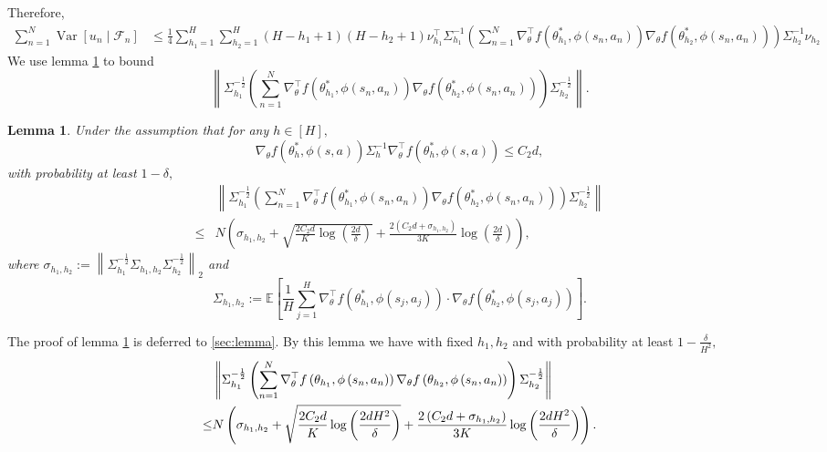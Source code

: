 \documentclass{article}
\numberwithin{equation}{section}
\theoremstyle{plain}
\newtheorem{lemma}[theorem]{Lemma}
\theoremstyle{definition}
\theoremstyle{remark}
\begin{document}
Therefore,
\begin{align}
    \sum_{n=1}^N \operatorname{Var}\left[u_n\mid \mathcal{F}_n\right]
    &\leq \frac{1}{4} \sum_{h_1=1}^H \sum_{h_2=1}^H (H-h_1+1)(H-h_2+1)\nu_{h_1}^{\top} \Sigma_{h_1}^{-1} \left(\sum_{n=1}^N \nabla_{\theta}^{\top}f\left(\theta_{h_1}^*, \phi\left(s_n, a_n\right)\right) \nabla_{\theta} f\left(\theta_{h_2}^*, \phi\left(s_n, a_n\right)\right) \right) \Sigma_{h_2}^{-1} \nu_{h_2} \label{positivity_variance}
\end{align}
We use lemma \ref{lemma_first_order} to bound
\begin{equation*}
    \left\|\Sigma_{h_1}^{-\frac{1}{2}} \left(\sum_{n=1}^N \nabla_{\theta}^{\top}f\left(\theta_{h_1}^*, \phi\left(s_n, a_n\right)\right) \nabla_{\theta} f\left(\theta_{h_2}^*, \phi\left(s_n, a_n\right)\right) \right) \Sigma_{h_2}^{-\frac{1}{2}}\right\|.
\end{equation*} 
\begin{lemma}\label{lemma_first_order}
   Under the assumption that for any $h \in [H],$
   $$
   \nabla_{\theta} f(\theta^*_h, \phi(s, a)) \Sigma_{h}^{-1} \nabla_{\theta}^{\top} f(\theta^*_h, \phi(s, a)) \leq C_{2} d,
   $$
   with probability at least $1 - \delta,$
   \begin{align*}
   &\left\|\Sigma_{h_1}^{-\frac{1}{2}} \left(\sum_{n=1}^N \nabla_{\theta}^{\top}f\left(\theta_{h_1}^*, \phi\left(s_n, a_n\right)\right) \nabla_{\theta} f\left(\theta_{h_2}^*, \phi\left(s_n, a_n\right)\right) \right) \Sigma_{h_2}^{-\frac{1}{2}}\right\| \\
   \leq& N\left(\sigma_{h_{1}, h_{2}}+\sqrt{\frac{2 C_{2} d}{K} \log \left(\frac{2 d }{\delta}\right)}+\frac{2\left(C_{2} d+\sigma_{h_{1}, h_{2}}\right)}{3 K} \log \left(\frac{2 d }{\delta}\right)\right),
   \end{align*}
   where $\sigma_{h_{1}, h_{2}}:=\left\|\Sigma_{h_{1}}^{-\frac{1}{2}} \Sigma_{h_{1}, h_{2}} \Sigma_{h_{2}}^{-\frac{1}{2}}\right\|_{2}$ and
   $$
   \Sigma_{h_1,h_2} := \mathbb{E}\left[\frac{1}{H}\sum_{j=1}^H \nabla_{\theta}^{\top}f\left(\theta_{h_1}^*, \phi\left(s_j, a_j\right)\right) \cdot \nabla_{\theta}f\left(\theta_{h_2}^*, \phi\left(s_j, a_j\right)\right)\right].
   $$
\end{lemma}
The proof of lemma \ref{lemma_first_order} is deferred to \ref{sec:lemma}. By this lemma we have with fixed $h_1,h_2$ and with probability at least $1 - \frac{\delta}{H^2},$
\begin{align}
    & \left\|\Sigma_{h_{1}}^{-\frac{1}{2}}\left(\sum_{n=1}^{N} \nabla_{\theta}^{\top} f\left(\theta_{h_{1}}, \phi\left(s_{n}, a_{n}\right)\right) \nabla_{\theta} f\left(\theta_{h_{2}}, \phi\left(s_{n}, a_{n}\right)\right)\right) \Sigma_{h_{2}}^{-\frac{1}{2}}\right\| \notag \\
    \leq&  N\left(\sigma_{h_1,h_2} + \sqrt{\frac{2C_2 d}{K}\log\left(\frac{2dH^2}{\delta}\right)} + \frac{2\left(C_2d+\sigma_{h_1,h_2}\right)}{3 K}\log\left(\frac{2dH^2}{\delta}\right)\right). \label{bound_finiteC1}
\end{align}
\end{document}
